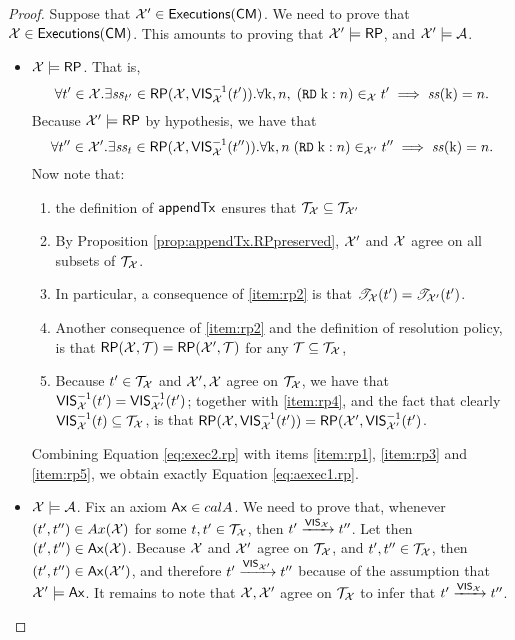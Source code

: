 \begin{proof}
Suppose that $\mathcal{X}' \in {\mathsf{Executions}}(\mathsf{CM})$. We need to prove that $\mathcal{X} \in {\mathsf{Executions}}(\mathsf{CM})$. 
	This amounts to proving that $\mathcal{X}' \models \mathsf{RP}$, and $\mathcal{X}' \models \mathcal{A}$. 
	\begin{itemize}
		\item $\mathcal{X} \models \mathsf{RP}$. That is, 
		\begin{equation}
		\label{eq:aexec1.rp}
		\forall t' \in \mathcal{X}. \exists \mathit{ss}_{t'} \in \mathsf{RP}(\mathcal{X}, {\mathsf{VIS}}^{-1}_{\mathcal{X}}(t')). \forall \mathrm{k},n,\; ({{\tt RD}}\;\mathrm{k}:n) \in_{\mathcal{X}} t' \implies \mathit{ss}(\mathrm{k}) = n.
		\end{equation}
		Because $\mathcal{X}' \models \mathsf{RP}$ by hypothesis, we have that 
		\begin{equation}
		\label{eq:exec2.rp}
		\forall t'' \in \mathcal{X}'. \exists \mathit{ss}_{t} \in \mathsf{RP}(\mathcal{X}, {\mathsf{VIS}}^{-1}_{\mathcal{X}}(t'')).\forall \mathrm{k},n\; ({{\tt RD}}\;\mathrm{k}: n) \in_{\mathcal{X}'} t'' \implies \mathit{ss}(\mathrm{k}) = n.
		\end{equation}
		Now note that:
		\begin{enumerate}
			\item\label{item:rp1} the definition of $\mathsf{appendTx}$ ensures that $\mathcal{T}_{\mathcal{X}} \subseteq \mathcal{T}_{\mathcal{X}'}$
			\item\label{item:rp2} By Proposition \ref{prop:appendTx.RPpreserved}, $\mathcal{X}'$ and $\mathcal{X}$ agree on all subsets of $\mathcal{T}_{\mathcal{X}}$. 
			\item\label{item:rp3} In particular, a consequence of \eqref{item:rp2} is that $\mathscr{T}_{\mathcal{X}}(t') = \mathscr{T}_{\mathcal{X}'}(t')$. 
			\item\label{item:rp4} Another consequence of \eqref{item:rp2} and the definition of resolution policy, is that 
			$\mathsf{RP}(\mathcal{X}, \mathcal{T}) = \mathsf{RP}(\mathcal{X}', \mathcal{T})$ for any $\mathcal{T} \subseteq \mathcal{T}_{\mathcal{X}}$, 
			\item\label{item:rp5} Because $t' \in \mathcal{T}_{\mathcal{X}}$ and $\mathcal{X}', \mathcal{X}$ agree on $\mathcal{T}_{\mathcal{X}}$, we have that 
		${\mathsf{VIS}}^{-1}_{\mathcal{X}}(t') = {\mathsf{VIS}}^{-1}_{\mathcal{X}'}(t')$; together with \eqref{item:rp4}, and the fact that clearly 
		${\mathsf{VIS}}^{-1}_{\mathcal{X}}(t) \subseteq \mathcal{T}_{\mathcal{X}}$, is that $\mathsf{RP}(\mathcal{X}, {\mathsf{VIS}}_{\mathcal{X}}^{-1}(t')) = \mathsf{RP}(\mathcal{X}', {\mathsf{VIS}}_{\mathcal{X}'}^{-1}(t')$.
		\end{enumerate}
		Combining Equation \eqref{eq:exec2.rp} with items \eqref{item:rp1}, \eqref{item:rp3} and \eqref{item:rp5}, 
		we obtain exactly Equation \eqref{eq:aexec1.rp}.
		\item $\mathcal{X} \models \mathcal{A}$. Fix an axiom $\mathsf{Ax} \in calA$. We need to prove that, whenever $(t', t'') \in Ax(\mathcal{X})$ for 
		some $t, t' \in \mathcal{T}_{\mathcal{X}}$, then $t' \xrightarrow{{\mathsf{VIS}}_{\mathcal{X}}} t''$. Let then $(t', t'') \in \mathsf{Ax}(\mathcal{X})$. 
		Because $\mathcal{X}$ and $\mathcal{X}'$ agree on $\mathcal{T}_{\mathcal{X}}$, and $t', t'' \in \mathcal{T}_{\mathcal{X}}$, 
		then $(t', t'') \in \mathsf{Ax}(\mathcal{X}')$, and therefore $t' \xrightarrow{{\mathsf{VIS}}_{\mathcal{X}'}} t''$ because of the assumption 
		that $\mathcal{X}' \models \mathsf{Ax}$. It remains to note that $\mathcal{X}, \mathcal{X}'$ agree on $\mathcal{T}_{\mathcal{X}}$ to infer 
		that $t' \xrightarrow{{\mathsf{VIS}}_{\mathcal{X}}} t''$.
\end{itemize}
\end{proof}

